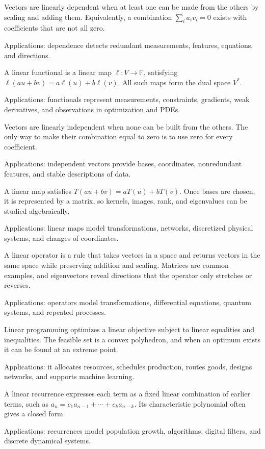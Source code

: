 Vectors are linearly dependent when at least one can be made from the others by scaling and adding them. Equivalently, a combination $\sum_i a_iv_i=0$ exists with coefficients that are not all zero. \par\noindent Applications: dependence detects redundant measurements, features, equations, and directions.

A linear functional is a linear map $\ell:V\to\mathbb F$, satisfying $\ell(au+bv)=a\ell(u)+b\ell(v)$. All such maps form the dual space $V^*$. \par\noindent Applications: functionals represent measurements, constraints, gradients, weak derivatives, and observations in optimization and PDEs.

Vectors are linearly independent when none can be built from the others. The only way to make their combination equal to zero is to use zero for every coefficient. \par\noindent Applications: independent vectors provide bases, coordinates, nonredundant features, and stable descriptions of data.

A linear map satisfies $T(au+bv)=aT(u)+bT(v)$. Once bases are chosen, it is represented by a matrix, so kernels, images, rank, and eigenvalues can be studied algebraically. \par\noindent Applications: linear maps model transformations, networks, discretized physical systems, and changes of coordinates.

A linear operator is a rule that takes vectors in a space and returns vectors in the same space while preserving addition and scaling. Matrices are common examples, and eigenvectors reveal directions that the operator only stretches or reverses. \par\noindent Applications: operators model transformations, differential equations, quantum systems, and repeated processes.

Linear programming optimizes a linear objective subject to linear equalities and inequalities. The feasible set is a convex polyhedron, and when an optimum exists it can be found at an extreme point. \par\noindent Applications: it allocates resources, schedules production, routes goods, designs networks, and supports machine learning.

A linear recurrence expresses each term as a fixed linear combination of earlier terms, such as $a_n=c_1a_{n-1}+\cdots+c_ka_{n-k}$. Its characteristic polynomial often gives a closed form. \par\noindent Applications: recurrences model population growth, algorithms, digital filters, and discrete dynamical systems.

